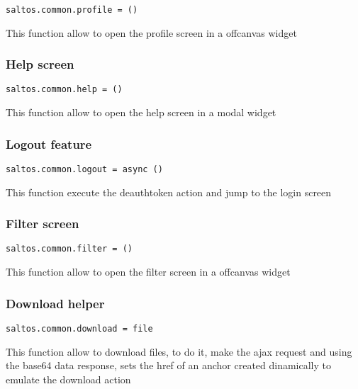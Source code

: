 \documentclass[a4paper]{article}
\begin{document}
\begin{lstlisting}
saltos.common.profile = ()
\end{lstlisting}

This function allow to open the profile screen in a offcanvas widget

\hypertarget{toc677}{}
\subsubsection{Help screen}

\begin{lstlisting}
saltos.common.help = ()
\end{lstlisting}

This function allow to open the help screen in a modal widget

\hypertarget{toc678}{}
\subsubsection{Logout feature}

\begin{lstlisting}
saltos.common.logout = async ()
\end{lstlisting}

This function execute the deauthtoken action and jump to the login screen

\hypertarget{toc679}{}
\subsubsection{Filter screen}

\begin{lstlisting}
saltos.common.filter = ()
\end{lstlisting}

This function allow to open the filter screen in a offcanvas widget

\hypertarget{toc680}{}
\subsubsection{Download helper}

\begin{lstlisting}
saltos.common.download = file
\end{lstlisting}

This function allow to download files, to do it, make the ajax request and
using the base64 data response, sets the href of an anchor created dinamically
to emulate the download action
\end{document}

